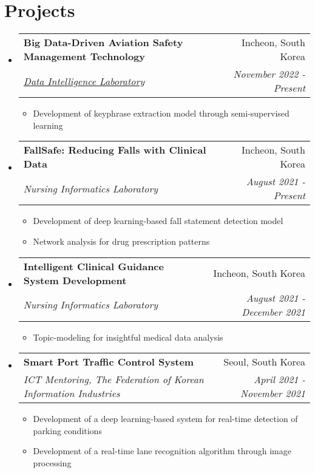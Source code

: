 \documentclass[letterpaper,11pt]{article}
\makeatletter
\newcommand{\resumeSubheading}[4]{
  \vspace{-1pt}\item
    \begin{tabular*}{0.97\textwidth}{l@{\extracolsep{\fill}}r}
      \textbf{#1} & #2 \\
      \textit{\small#3} & \textit{\small #4} \\
    \end{tabular*}\vspace{-5pt}
}
\makeatother
\begin{document}
    \section{Projects}
    \begin{itemize}[leftmargin=*,label=]
        \resumeSubheading
        {Big Data-Driven Aviation Safety Management Technology}{Incheon, South Korea}
            {\href{http://dilab.inha.ac.kr/}{Data Intelligence Laboratory}}{November 2022 - Present}
            \begin{itemize}[label=\bullet]
                \item{Development of keyphrase extraction model through semi-supervised learning}
            \end{itemize}
        \resumeSubheading
        {FallSafe: Reducing Falls with Clinical Data}{Incheon, South Korea}
            {Nursing Informatics Laboratory}{August 2021 - Present}
            \begin{itemize}[label=\bullet]
                \item{Development of deep learning-based fall statement detection model}
                \item{Network analysis for drug prescription patterns}
            \end{itemize}
        \resumeSubheading
        {Intelligent Clinical Guidance System Development}{Incheon, South Korea}
            {Nursing Informatics Laboratory}{August 2021 - December 2021}
            \begin{itemize}[label=\bullet]
                \item{Topic-modeling for insightful medical data analysis}
            \end{itemize}
        \resumeSubheading
        {Smart Port Traffic Control System}{Seoul, South Korea}
            {ICT Mentoring, The Federation of Korean Information Industries}{April 2021 - November 2021}
            \begin{itemize}[label=\bullet]
                \item{Development of a deep learning-based system for real-time detection of parking conditions}
                \item{Development of a real-time lane recognition algorithm through image processing}
            \end{itemize}
    \end{itemize}
    
\end{document}
